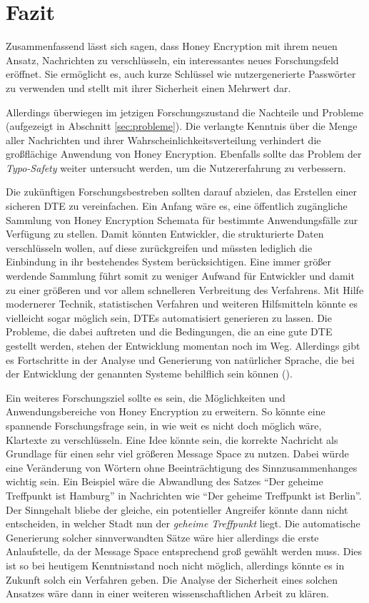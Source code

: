 \section{Fazit}
\label{sec:fazit}
Zusammenfassend lässt sich sagen, dass Honey Encryption mit ihrem neuen Ansatz, Nachrichten zu verschlüsseln, ein interessantes neues Forschungsfeld eröffnet. Sie ermöglicht es, auch kurze Schlüssel wie nutzergenerierte Passwörter zu verwenden und stellt mit ihrer Sicherheit einen Mehrwert dar.

Allerdings überwiegen im jetzigen Forschungszustand die Nachteile und Probleme (aufgezeigt in Abschnitt \ref{sec:probleme}). Die verlangte Kenntnis über die Menge aller Nachrichten und ihrer Wahrscheinlichkeitsverteilung verhindert die großflächige Anwendung von Honey Encryption. Ebenfalls sollte das Problem der \emph{Typo-Safety} weiter untersucht werden, um die Nutzererfahrung zu verbessern.

Die zukünftigen Forschungsbestreben sollten darauf abzielen, das Erstellen einer sicheren DTE zu vereinfachen. Ein Anfang wäre es, eine öffentlich zugängliche Sammlung von Honey Encryption Schemata für bestimmte Anwendungsfälle zur Verfügung zu stellen. Damit könnten Entwickler, die strukturierte Daten verschlüsseln wollen, auf diese zurückgreifen und müssten lediglich die Einbindung in ihr bestehendes System berücksichtigen. Eine immer größer werdende Sammlung führt somit zu weniger Aufwand für Entwickler und damit zu einer größeren und vor allem schnelleren Verbreitung des Verfahrens. Mit Hilfe modernerer Technik, statistischen Verfahren und weiteren Hilfsmitteln könnte es vielleicht sogar möglich sein, DTEs automatisiert generieren zu lassen. Die Probleme, die dabei auftreten und die Bedingungen, die an eine gute DTE gestellt werden, stehen der Entwicklung momentan noch im Weg. Allerdings gibt es Fortschritte in der Analyse und Generierung von natürlicher Sprache, die bei der Entwicklung der genannten Systeme behilflich sein können (\cite{CRCS2014}).

Ein weiteres Forschungsziel sollte es sein, die Möglichkeiten und Anwendungsbereiche von Honey Encryption zu erweitern. So könnte eine spannende Forschungsfrage sein, in wie weit es nicht doch möglich wäre, Klartexte zu verschlüsseln. Eine Idee könnte sein, die korrekte Nachricht als Grundlage für einen sehr viel größeren Message Space zu nutzen. Dabei würde eine Veränderung von Wörtern ohne Beeinträchtigung des Sinnzusammenhanges wichtig sein. Ein Beispiel wäre die Abwandlung des Satzes ``Der geheime Treffpunkt ist Hamburg'' in Nachrichten wie ``Der geheime Treffpunkt ist Berlin''. Der Sinngehalt bliebe der gleiche, ein potentieller Angreifer könnte dann nicht entscheiden, in welcher Stadt nun der \emph{geheime Treffpunkt} liegt. Die automatische Generierung solcher sinnverwandten Sätze wäre hier allerdings die erste Anlaufstelle, da der Message Space entsprechend groß gewählt werden muss. Dies ist so bei heutigem Kenntnisstand noch nicht möglich, allerdings könnte es in Zukunft solch ein Verfahren geben. Die Analyse der Sicherheit eines solchen Ansatzes wäre dann in einer weiteren wissenschaftlichen Arbeit zu klären.

